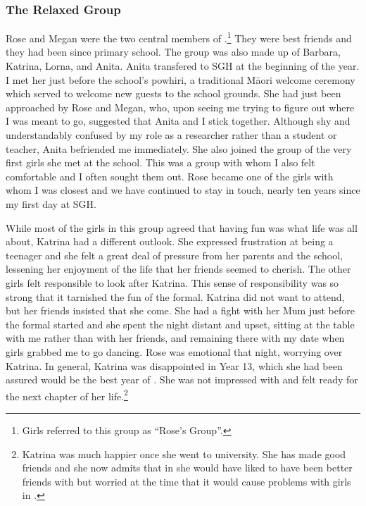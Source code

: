 
\subsubsection{The Relaxed Group}\label{relaxedgroup}

Rose and Megan were the two central members of .\footnote{Girls referred to this group as ``Rose's Group''.}  They were best friends and they had been since primary school. The group was also made up of Barbara, Katrina, Lorna, and Anita. Anita transfered to SGH at the beginning of the year. I met her just before the school's powhiri, a traditional M\=aori welcome ceremony which served to welcome new guests to the school grounds. She had just been approached by Rose and Megan, who, upon seeing me trying to figure out where I was meant to go, suggested that Anita and I stick together. Although shy and understandably confused by my role as a researcher rather than a student or teacher, Anita befriended me immediately. She also joined the group of the very first girls she met at the school. This was a group with whom I also felt comfortable and I often sought them out. Rose became one of the girls with whom I was closest and we have continued to stay in touch, nearly ten years since my first day at SGH.

While most of the girls in this group agreed that having fun was what life was all about, Katrina had a different outlook. She expressed frustration at being a teenager and she felt a great deal of pressure from her parents and the school, lessening her enjoyment of the life that her friends seemed to cherish. The other girls felt responsible to look after Katrina. This sense of responsibility was so strong that it tarnished the fun of the formal. Katrina did not want to attend, but her friends insisted that she come. She had a fight with her Mum just before the formal started and she spent the night distant and upset, sitting at the table with me rather than with her friends, and remaining there with my date when girls grabbed me to go dancing. Rose was emotional that night, worrying over Katrina. In general, Katrina was disappointed in Year 13, which she had been assured would be the best year of . She was not impressed with  and felt ready for the next chapter of her life.\footnote{Katrina was much happier once she went to university. She has made good friends and she now admits that in  she would have liked to have been better friends with  but worried at the time that it would cause problems with girls in .}  

